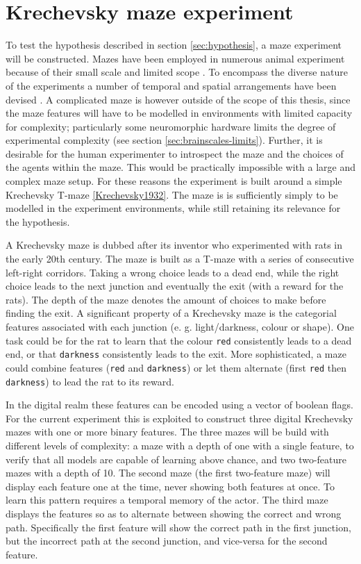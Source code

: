 \section{Krechevsky maze experiment}
To test the hypothesis described in section \ref{sec:hypothesis}, a maze experiment will be constructed.
Mazes have been employed in numerous animal experiment because of their small scale and limited scope \autocite{Krechevsky1932,Tolman1927}.
To encompass the diverse nature of the experiments a number of temporal and spatial arrangements have been devised \autocite{Tolman1927}.
A complicated maze is however outside of the scope of this thesis, since the maze features will have to be modelled in environments with limited capacity for complexity; particularly some neuromorphic hardware limits the degree of experimental complexity (see section \ref{sec:brainscales-limits}).
Further, it is desirable for the human experimenter to introspect the maze and the choices of the agents within the maze.
This would be practically impossible with a large and complex maze setup.
For these reasons the experiment is built around a simple Krechevsky T-maze \ref{Krechevsky1932}.
The maze is is sufficiently simply to be modelled in the experiment environments, while still retaining its relevance for the hypothesis.

A Krechevsky maze is dubbed after its inventor who experimented with rats in the early 20th century.
The maze is built as a T-maze with a series of consecutive left-right corridors.
Taking a wrong choice leads to a dead end, while the right choice leads to the next junction and eventually the exit (with a reward for the rats).
The depth of the maze denotes the amount of choices to make before finding the exit.
A significant property of a Krechevsky maze is the categorial features associated with each junction (e. g. light/darkness, colour or shape).
One task could be for the rat to learn that the colour \texttt{red} consistently leads to a dead end, or that \texttt{darkness} consistently leads to the exit.
More sophisticated, a maze could combine features (\texttt{red} and \texttt{darkness}) or let them alternate (first \texttt{red} then \texttt{darkness}) to lead the rat to its reward.

In the digital realm these features can be encoded using a vector of boolean flags.
For the current experiment this is exploited to construct three digital Krechevsky mazes with one or more binary features.
The three mazes will be build with different levels of complexity: a maze with a depth of one with a single feature, to verify that all models are capable of learning above chance, and two two-feature mazes with a depth of 10.
The second maze (the first two-feature maze) will display each feature one at the time, never showing both features at once.
To learn this pattern requires a temporal memory of the actor.
The third maze displays the features so as to alternate between showing the correct and wrong path.
Specifically the first feature will show the correct path in the first junction, but the incorrect path at the second junction, and vice-versa for the second feature.

